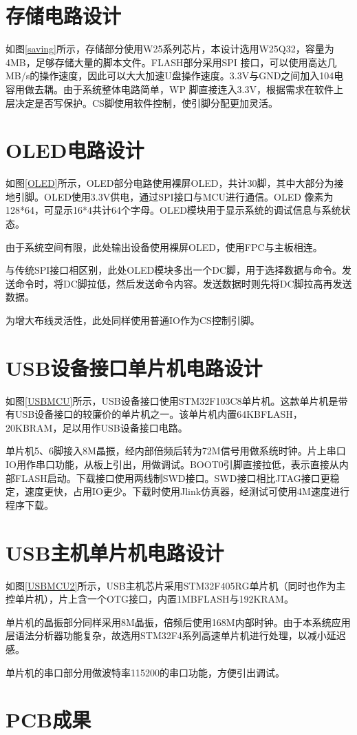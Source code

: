 \section{存储电路设计}
如图\ref{saving}所示，存储部分使用W25系列芯片，本设计选用W25Q32，容量为4MB，足够存储大量的脚本文件。FLASH部分采用SPI 接口，可以使用高达几MB/s的操作速度，因此可以大大加速U盘操作速度。3.3V与GND之间加入104电容用做去耦。由于系统整体电路简单，WP 脚直接连入3.3V，根据需求在软件上层决定是否写保护。CS脚使用软件控制，使引脚分配更加灵活。

\section{OLED电路设计}
如图\ref{OLED}所示，OLED部分电路使用裸屏OLED，共计30脚，其中大部分为接地引脚。OLED使用3.3V供电，通过SPI接口与MCU进行通信。OLED 像素为128*64，可显示16*4共计64个字母。OLED模块用于显示系统的调试信息与系统状态。

由于系统空间有限，此处输出设备使用裸屏OLED，使用FPC与主板相连。

与传统SPI接口相区别，此处OLED模块多出一个DC脚，用于选择数据与命令。发送命令时，将DC脚拉低，然后发送命令内容。发送数据时则先将DC脚拉高再发送数据。

为增大布线灵活性，此处同样使用普通IO作为CS控制引脚。

\section{USB设备接口单片机电路设计}
如图\ref{USBMCU}所示，USB设备接口使用STM32F103C8单片机。这款单片机是带有USB设备接口的较廉价的单片机之一。该单片机内置64KBFLASH，20KBRAM，足以用作USB设备接口电路。

单片机5、6脚接入8M晶振，经内部倍频后转为72M信号用做系统时钟。片上串口IO用作串口功能，从板上引出，用做调试。BOOT0引脚直接拉低，表示直接从内部FLASH启动。下载接口使用两线制SWD接口。SWD接口相比JTAG接口更稳定，速度更快，占用IO更少。下载时使用Jlink仿真器，经测试可使用4M速度进行程序下载。

\section{USB主机单片机电路设计}

如图\ref{USBMCU2}所示，USB主机芯片采用STM32F405RG单片机（同时也作为主控单片机），片上含一个OTG接口，内置1MBFLASH与192KRAM。

单片机的晶振部分同样采用8M晶振，倍频后使用168M内部时钟。由于本系统应用层语法分析器功能复杂，故选用STM32F4系列高速单片机进行处理，以减小延迟感。

单片机的串口部分用做波特率115200的串口功能，方便引出调试。

\section{PCB成果}



